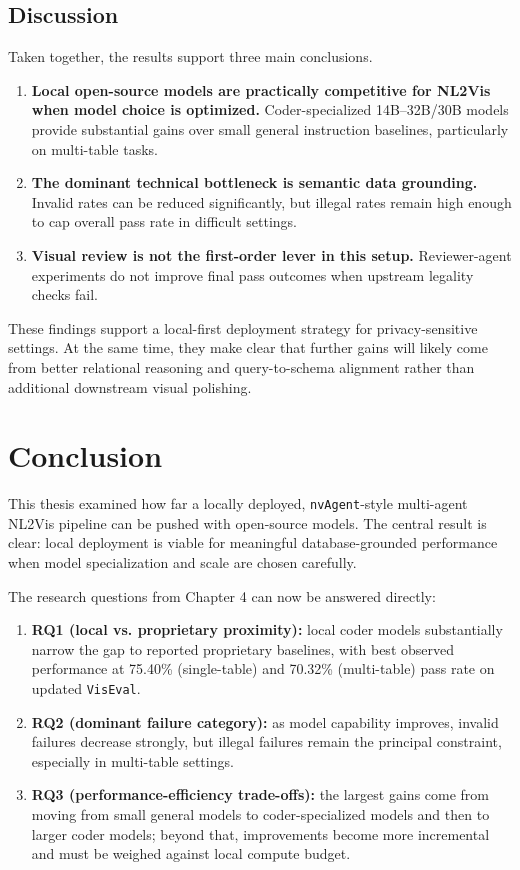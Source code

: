 \documentclass[a4paper,oneside,bibliography=totoc]{scrbook}
\begin{document}
\section{Discussion}
\label{sec:discussion}

Taken together, the results support three main conclusions.
\begin{enumerate}
  \item \textbf{Local open-source models are practically competitive for NL2Vis when model choice is optimized.} Coder-specialized 14B--32B/30B models provide substantial gains over small general instruction baselines, particularly on multi-table tasks.
  \item \textbf{The dominant technical bottleneck is semantic data grounding.} Invalid rates can be reduced significantly, but illegal rates remain high enough to cap overall pass rate in difficult settings.
  \item \textbf{Visual review is not the first-order lever in this setup.} Reviewer-agent experiments do not improve final pass outcomes when upstream legality checks fail.
\end{enumerate}

These findings support a local-first deployment strategy for privacy-sensitive settings. At the same time, they make clear that further gains will likely come from better relational reasoning and query-to-schema alignment rather than additional downstream visual polishing.

\chapter{Conclusion}

This thesis examined how far a locally deployed, \texttt{nvAgent}-style multi-agent NL2Vis pipeline can be pushed with open-source models. The central result is clear: local deployment is viable for meaningful database-grounded performance when model specialization and scale are chosen carefully.

The research questions from Chapter 4 can now be answered directly:
\begin{enumerate}
  \item \textbf{RQ1 (local vs. proprietary proximity):} local coder models substantially narrow the gap to reported proprietary baselines, with best observed performance at 75.40\% (single-table) and 70.32\% (multi-table) pass rate on updated \texttt{VisEval}.
  \item \textbf{RQ2 (dominant failure category):} as model capability improves, invalid failures decrease strongly, but illegal failures remain the principal constraint, especially in multi-table settings.
  \item \textbf{RQ3 (performance-efficiency trade-offs):} the largest gains come from moving from small general models to coder-specialized models and then to larger coder models; beyond that, improvements become more incremental and must be weighed against local compute budget.
\end{enumerate}
\end{document}

